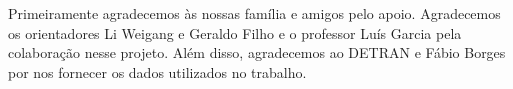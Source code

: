 Primeiramente agradecemos às nossas família e amigos pelo apoio. Agradecemos os orientadores Li Weigang e Geraldo Filho e o professor Luís Garcia pela colaboração nesse projeto. Além disso, agradecemos ao DETRAN e Fábio Borges por nos fornecer os dados utilizados no trabalho.